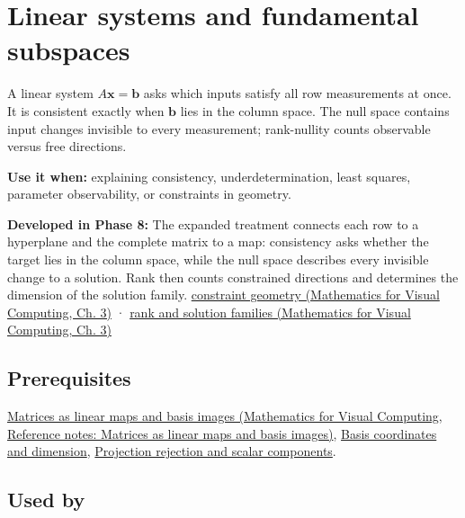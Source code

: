 \hypertarget{appendix-8572a4a060c1}{}\label{referencestart:appendix-8572a4a060c1}
\section{Linear systems and fundamental subspaces}\label{appendix-8572a4a060c1-linear-systems-and-fundamental-subspaces}

A linear system \(A\mathbf x=\mathbf b\) asks which inputs satisfy all row measurements at once. It is consistent exactly when \(\mathbf b\) lies in the column space. The null space contains input changes invisible to every measurement; rank-nullity counts observable versus free directions.

\textbf{Use it when:} explaining consistency, underdetermination, least squares, parameter observability, or constraints in geometry.

\textbf{Developed in Phase 8:} The expanded treatment connects each row to a hyperplane and the complete matrix to a map: consistency asks whether the target lies in the column space, while the null space describes every invisible change to a solution. Rank then counts constrained directions and determines the dimension of the solution family. \href{../02-Mathematics-for-Visual-Computing/main.pdf\#nameddest=01-foundations-i-ch019-a-system-is-an-intersection-of-constraints}{constraint geometry (Mathematics for Visual Computing, Ch. 3)} · \href{../02-Mathematics-for-Visual-Computing/main.pdf\#nameddest=01-foundations-i-ch019-rank-the-four-spaces-and-the-shape-of-the-answer}{rank and solution families (Mathematics for Visual Computing, Ch. 3)}

\subsection{Prerequisites}\label{appendix-8572a4a060c1-prerequisites}

\href{../02-Mathematics-for-Visual-Computing/main.pdf\#nameddest=appendix-bd39c3bf5d64}{Matrices as linear maps and basis images (Mathematics for Visual Computing, Reference notes: Matrices as linear maps and basis images)}, \hyperref[appendix-ce0341f7ea0d]{Basis coordinates and dimension}, \hyperref[appendix-505a502c372a]{Projection rejection and scalar components}.

\subsection{Used by}\label{appendix-8572a4a060c1-used-by}

